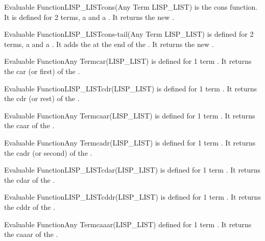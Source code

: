 \begin{typeefa}{Evaluable Function}{LISP\_LIST}{cons}{(Any Term LISP\_LIST)}
is the cons function. It is defined for 2 terms, a  and a
.  It returns the new .
\end{typeefa}

\begin{typeefa}{Evaluable Function}{LISP\_LIST}{cons-tail}{(Any Term LISP\_LIST)}
is defined for 2 terms, a  and a .  It adds the
 at the end of the .  It returns the new
.
\end{typeefa}

\begin{typeefa}{Evaluable Function}{Any Term}{car}{(LISP\_LIST)}
is defined for 1 term . It returns the car (or first)  of
the .
\end{typeefa}

\begin{typeefa}{Evaluable Function}{LISP\_LIST}{cdr}{(LISP\_LIST)}
is defined for 1 term . It returns the cdr (or rest)  of
the .
\end{typeefa}

\begin{typeefa}{Evaluable Function}{Any Term}{caar}{(LISP\_LIST)}
is defined for 1 term . It returns the caar  of the
.
\end{typeefa}

\begin{typeefa}{Evaluable Function}{Any Term}{cadr}{(LISP\_LIST)}
is defined for 1 term . It returns the cadr (or second) 
of the .
\end{typeefa}

\begin{typeefa}{Evaluable Function}{LISP\_LIST}{cdar}{(LISP\_LIST)}
is defined for 1 term . It returns the cdar  of the
.
\end{typeefa}

\begin{typeefa}{Evaluable Function}{LISP\_LIST}{cddr}{(LISP\_LIST)}
is defined for 1 term . It returns the cddr  of the
.
\end{typeefa}

\begin{typeefa}{Evaluable Function}{Any Term}{caaar}{(LISP\_LIST)}
defined for 1 term . It returns the caaar  of the
.
\end{typeefa}

